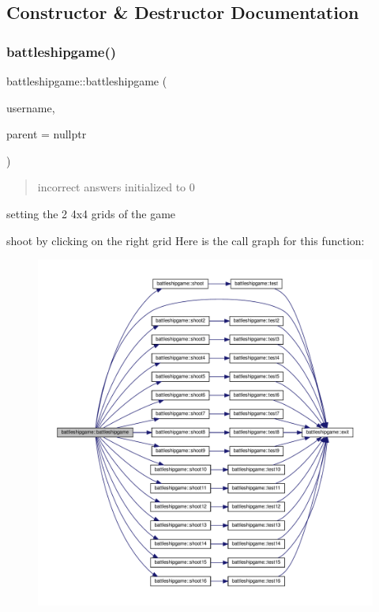 \subsection{Constructor \& Destructor Documentation}
\mbox{\label{classbattleshipgame_a47d39ce6859afe84cceedd678b9252d7}} 
\subsubsection{\texorpdfstring{battleshipgame()}{battleshipgame()}}
{\footnotesize\ttfamily battleshipgame\+::battleshipgame (\begin{DoxyParamCaption}\item[{Q\+String \&}]{username,  }\item[{Q\+Widget $\ast$}]{parent = {\ttfamily nullptr} }\end{DoxyParamCaption})}



\begin{quote}
incorrect answers initialized to 0 \end{quote}


setting the 2 4x4 grids of the game

shoot by clicking on the right grid Here is the call graph for this function\+:
\nopagebreak
\begin{figure}[H]
\begin{center}
\leavevmode
\includegraphics[width=350pt]{classbattleshipgame_a47d39ce6859afe84cceedd678b9252d7_cgraph}
\end{center}
\end{figure}


